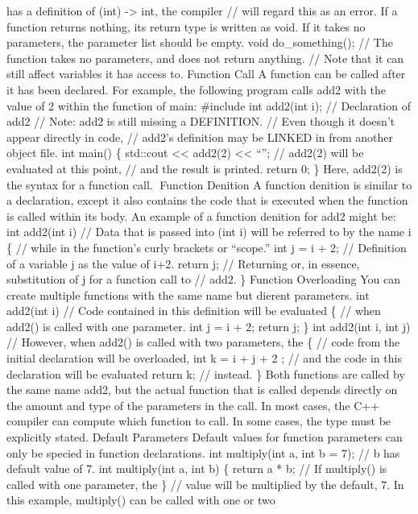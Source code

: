{has a definition of (int) -\textgreater{} int, the compiler // will
regard this as an error. If a function returns nothing, its return type
is written as void. If it takes no parameters, the parameter list should
be empty. void do\_something(); // The function takes no parameters, and
does not return anything. // Note that it can still affect variables it
has access to. Function Call A function can be called after it has been
declared. For example, the following program calls add2 with the value
of 2 within the function of main: \#include int add2(int i); //
Declaration of add2 // Note: add2 is still missing a DEFINITION. // Even
though it doesn't appear directly in code, // add2's definition may be
LINKED in from another object file. int main() \{ std::cout
\textless\textless{} add2(2) \textless\textless{} ``\n''; // add2(2)
will be evaluated at this point, // and the result is printed. return 0;
\} Here, add2(2) is the syntax for a function call. Function Denition A
function denition} is similar to a declaration, except it also contains
the code that is executed when the function is called within its body.
An example of a function denition for add2 might be: int add2(int i) //
Data that is passed into (int i) will be referred to by the name i \{ //
while in the function's curly brackets or ``scope.'' int j = i + 2; //
Definition of a variable j as the value of i+2. return j; // Returning
or, in essence, substitution of j for a function call to // add2. \}
Function Overloading You can create multiple functions with the same
name but dierent parameters. int add2(int i) // Code contained in this
definition will be evaluated \{ // when add2() is called with one
parameter. int j = i + 2; return j; \} int add2(int i, int j) //
However, when add2() is called with two parameters, the \{ // code from
the initial declaration will be overloaded, int k = i + j + 2 ; // and
the code in this declaration will be evaluated return k; // instead. \}
Both functions are called by the same name add2, but the actual function
that is called depends directly on the amount and type of the parameters
in the call. In most cases, the C++ compiler can compute which function
to call. In some cases, the type must be explicitly stated. Default
Parameters Default values for function parameters can only be specied in
function declarations. int multiply(int a, int b = 7); // b has default
value of 7. int multiply(int a, int b) \{ return a * b; // If multiply()
is called with one parameter, the \} // value will be multiplied by the
default, 7. In this example, multiply() can be called with one or two
